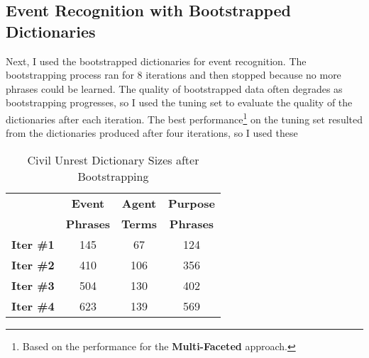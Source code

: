\subsection{Event Recognition with Bootstrapped Dictionaries}
\label{eval-cu}
Next, I used the bootstrapped dictionaries for event recognition.
The bootstrapping process ran for 8 iterations and then stopped
because no more phrases could be learned. The quality of bootstrapped
data often degrades as bootstrapping progresses, so I used the tuning
set to evaluate the quality of the dictionaries after each iteration.  The best
performance\footnote{Based on the performance for the {\bf Multi-Faceted}
  approach.} on the tuning set resulted from the dictionaries 
produced after four iterations, so I used these
\begin{table}[ht]
\small
\centering
\begin{tabular}[center]{|lccc|} \hline
{\bf } & {\bf Event} & {\bf Agent} & {\bf Purpose}\\ 
{\bf } & {\bf Phrases} & {\bf Terms} & {\bf Phrases}\\ \hline 
{\bf Iter \#1} & 145 & 67 & 124 \\
{\bf Iter \#2} & 410 & 106 & 356 \\
{\bf Iter \#3} & 504 & 130 & 402 \\ 
{\bf Iter \#4} & 623 & 139 & 569 \\ \hline
\end{tabular}
\caption{Civil Unrest Dictionary Sizes after Bootstrapping}
\label{size-iter}
\end{table}

